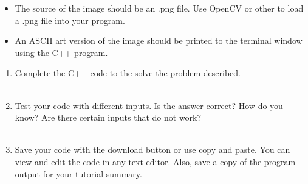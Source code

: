 \documentclass[12pt]{article}
\begin{document}
\begin{description}[labelindent=1cm]
\begin{itemize}
	
	\item The source of the image should be an .png file. Use OpenCV or other to load a .png file into your program. 
	
	\item An ASCII art version of the image should be printed to the terminal window using the C++ program.

	
\end{itemize}

\newpage

%
%	
%
%
%
%	
%	
%	
%	
%	
%	
%
%
%		

	\item[\textbf{\underline{Part 3 - Testing:}}] \hfill \vspace{0mm}
	\begin{enumerate}
	
		\item Complete the C++ code to the solve the problem described. \\\\
		
		\item Test your code with different inputs. Is the answer correct? How do you know? Are there certain inputs that do not work? \\\\
		
	
		\item Save your code with the download button or use copy and paste. You can view and edit the code in any text editor. Also, save a copy of the program output for your tutorial summary. \\\\


\end{enumerate}
\end{description}
\end{document}
